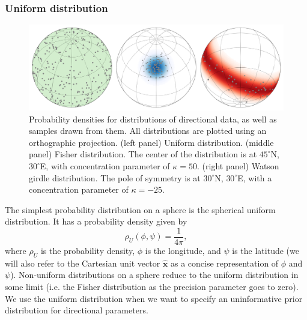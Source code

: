 \documentclass[11pt,letterpaper]{article}
\begin{document}
\subsubsection*{Uniform distribution}
\begin{figure}
\centering
\includegraphics[width=\textwidth]{fig_direction_distributions.png}
\caption[Spherical probability distributions.]{Probability densities for distributions of directional data, as well as samples drawn from them. All distributions are plotted using an orthographic projection. (left panel) Uniform distribution. (middle panel) Fisher distribution. The center of the distribution is at $45^\circ$N, $30^\circ$E, with concentration parameter of $\kappa=50$. (right panel) Watson girdle distribution. The pole of symmetry is at $30^\circ$N, $30^\circ$E, with a concentration parameter of $\kappa=-25$.}
\label{fig:distributions}
\end{figure}

The simplest probability distribution on a sphere is the spherical uniform distribution. It has a probability density given by
\begin{equation}
  \rho_U(\phi, \psi) = \frac{1}{4 \pi},
\end{equation}
where $\rho_U$ is the probability density, $\phi$ is the longitude, and $\psi$ is the latitude (we will also refer to the Cartesian unit vector $\hat{\mathbf{x}}$ as a concise representation of $\phi$ and $\psi$). Non-uniform distributions on a sphere reduce to the uniform distribution in some limit (i.e. the Fisher distribution as the precision parameter goes to zero). We use the uniform distribution when we want to specify an uninformative prior distribution for directional parameters.
\end{document}
